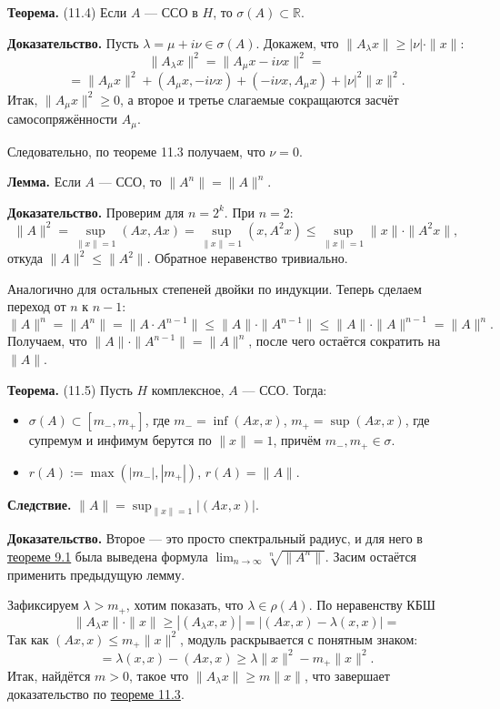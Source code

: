 \QED

\label{th:11-4} \textbf{Теорема.} (11.4) Если $A$ --- ССО в $H$, то $\sigma(A) \subset \mathbb R$.

\textbf{Доказательство.} Пусть $\lambda = \mu + i \nu \in \sigma(A)$.
Докажем, что $\|A_\lambda x\| \ge |\nu| \cdot \|x\|$:
\[
    \|A_\lambda x\|^2 = \|A_\mu x - i \nu x\|^2 = 
\]
\[
    = \|A_\mu x\|^2 + (A_\mu x, - i\nu x) + (-i \nu x, A_\mu x) + |\nu|^2 \|x\|^2.
\]
Итак, $\|A_\mu x\|^2 \ge 0$, а второе и третье слагаемые сокращаются засчёт самосопряжённости $A_\mu$.

Следовательно, по теореме 11.3 получаем, что $\nu = 0$.

\QED

\textbf{Лемма.} Если $A$ --- ССО, то $\|A^n\| = \|A\|^n$.

\textbf{Доказательство.} Проверим для $n = 2^k$.
При $n = 2$:
\[
    \|A\|^2 = \sup_{\|x\| = 1} (Ax, Ax) = \sup_{\|x\| = 1} (x, A^2 x) \le \sup_{\|x\| = 1} \|x\| \cdot \|A^2 x\|,
\]
откуда $\|A\|^2 \le \|A^2\|$.
Обратное неравенство тривиально.

Аналогично для остальных степеней двойки по индукции.
Теперь сделаем переход от $n$ к $n - 1$:
\[
    \|A\|^n = \|A^n\| = \|A \cdot A^{n-1}\| \le \|A\| \cdot \|A^{n-1}\| \le \|A\| \cdot \|A\|^{n-1} = \|A\|^n.
\]
Получаем, что $\|A\| \cdot \|A^{n-1}\| = \|A\|^n$, после чего остаётся сократить на $\|A\|$.

\QED

\label{th:11-5} \textbf{Теорема.} (11.5) Пусть $H$ комплексное, $A$ --- ССО.
Тогда:
\begin{itemize}
    \item $\sigma(A) \subset [m_-, m_+]$, где $m_- = \inf (Ax, x)$, $m_+ = \sup (Ax, x)$, где супремум и инфимум берутся по $\|x\| = 1$, причём $m_-, m_+ \in \sigma$.
    \item $r(A) := \max(|m_-|, |m_+|)$, $r(A) = \|A\|$.
\end{itemize}

\textbf{Следствие.} $\|A\| = \sup_{\|x\| = 1} |(Ax, x)|$.

\textbf{Доказательство.} 
Второе --- это просто спектральный радиус, и для него в \hyperref[th:9-1]{теореме 9.1} была выведена формула $\lim_{n \to \infty} \sqrt[n]{\|A^n\|}$.
Засим остаётся применить предыдущую лемму.

Зафиксируем $\lambda > m_+$, хотим показать, что $\lambda \in \rho(A)$.
По неравенству КБШ
\[
    \|A_\lambda x\| \cdot \|x\| \ge |(A_\lambda x, x)| = |(Ax, x) - \lambda (x, x)| =
\]
Так как $(Ax, x) \le m_+\|x\|^2$, модуль раскрывается с понятным знаком:
\[
    = \lambda(x, x) - (Ax, x) \ge \lambda \|x\|^2 - m_+\|x\|^2.
\]
Итак, найдётся $m > 0$, такое что $\|A_\lambda x\| \ge m \|x\|$, что завершает доказательство по \hyperref[th:11-3]{теореме 11.3}.

